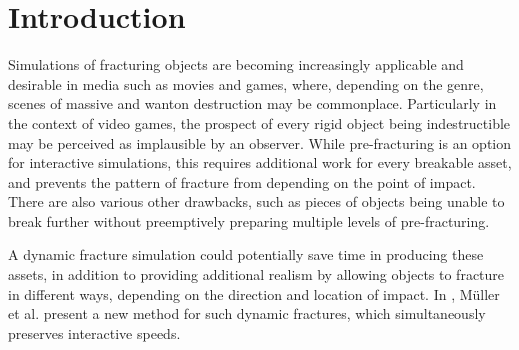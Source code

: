 \documentclass[tog]{acmsiggraph}
\begin{document}

\begin{CRcatlist}
\end{CRcatlist}


\keywordlist




\copyrightspace


\section{Introduction}

Simulations of fracturing objects are becoming increasingly applicable
and desirable in media such as movies and games, where, depending on
the genre, scenes of massive and wanton destruction may be
commonplace. Particularly in the context of video games, the prospect
of every rigid object being indestructible may be perceived as
implausible by an observer. While pre-fracturing is an option for
interactive simulations, this requires additional work for every
breakable asset, and prevents the pattern of fracture from depending
on the point of impact. There are also various other drawbacks, such
as pieces of objects being unable to break further without
preemptively preparing multiple levels of pre-fracturing.

A dynamic fracture simulation could potentially save time in producing
these assets, in addition to providing additional realism by allowing
objects to fracture in different ways, depending on the direction and
location of impact. In \cite{Mul13}, M\"uller et al. present a new
method for such dynamic fractures, which simultaneously preserves
interactive speeds.
\end{document}
